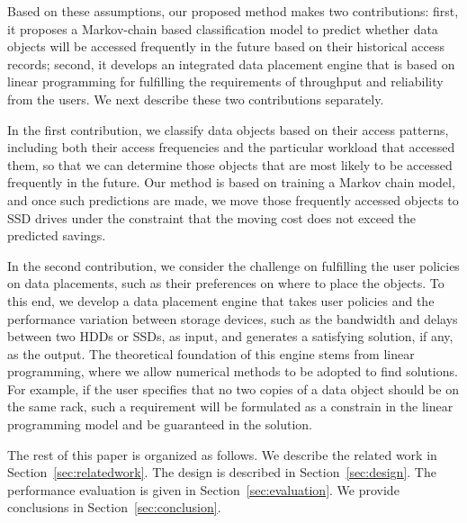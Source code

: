 Based on these assumptions, our proposed method makes two contributions: first, it proposes a Markov-chain based classification model to predict whether data objects will be accessed frequently in the future based on their historical access records; second, it develops an integrated data placement engine that is based on linear programming for fulfilling the requirements of throughput and reliability from the users.  We next describe these two contributions separately.

In the first contribution, we classify data objects based on their access patterns, including both their access frequencies and the particular workload that accessed them, so that we can determine those objects that are most likely to be accessed frequently in the future. Our method is based on training a Markov chain model, and once such predictions are made, we move
those frequently accessed objects to SSD drives under the constraint that the moving cost does not exceed the predicted savings.

In the second contribution, we consider the challenge on fulfilling the user policies on data placements, such as their preferences on where to place the objects. To this end, we develop a data placement engine that takes user policies and the performance variation between storage devices, such as the bandwidth and delays between two HDDs or SSDs, as input, and generates a satisfying solution, if any, as the output. The theoretical foundation of this engine stems from linear programming, where we allow numerical methods to be adopted to find solutions. For example, if the user specifies that no two
copies of a data object should be on the same rack, such a requirement will be formulated as a constrain in the linear programming model and be guaranteed in the solution.

%


The rest of this paper is organized as follows. We describe the related work in Section~\ref{sec:relatedwork}. The design is described in Section~\ref{sec:design}. The performance evaluation is given in Section~\ref{sec:evaluation}. We provide conclusions in Section~\ref{sec:conclusion}. %
















